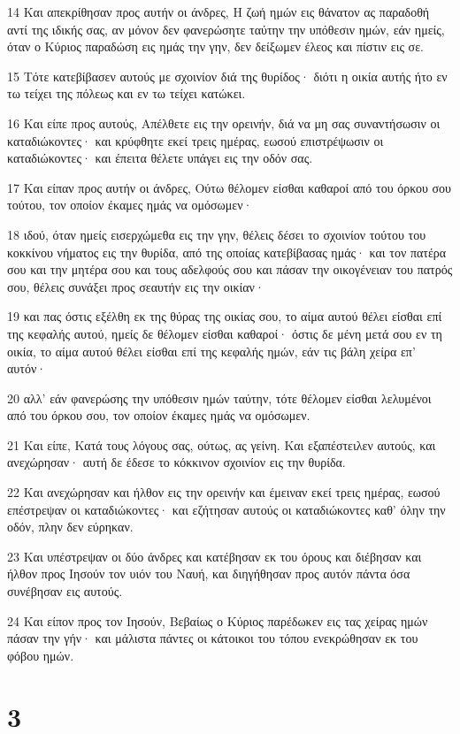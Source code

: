 \par 14 Και απεκρίθησαν προς αυτήν οι άνδρες, Η ζωή ημών εις θάνατον ας παραδοθή αντί της ιδικής σας, αν μόνον δεν φανερώσητε ταύτην την υπόθεσιν ημών, εάν ημείς, όταν ο Κύριος παραδώση εις ημάς την γην, δεν δείξωμεν έλεος και πίστιν εις σε.
\par 15 Τότε κατεβίβασεν αυτούς με σχοινίον διά της θυρίδος· διότι η οικία αυτής ήτο εν τω τείχει της πόλεως και εν τω τείχει κατώκει.
\par 16 Και είπε προς αυτούς, Απέλθετε εις την ορεινήν, διά να μη σας συναντήσωσιν οι καταδιώκοντες· και κρύφθητε εκεί τρεις ημέρας, εωσού επιστρέψωσιν οι καταδιώκοντες· και έπειτα θέλετε υπάγει εις την οδόν σας.
\par 17 Και είπαν προς αυτήν οι άνδρες, Ούτω θέλομεν είσθαι καθαροί από του όρκου σου τούτου, τον οποίον έκαμες ημάς να ομόσωμεν·
\par 18 ιδού, όταν ημείς εισερχώμεθα εις την γην, θέλεις δέσει το σχοινίον τούτου του κοκκίνου νήματος εις την θυρίδα, από της οποίας κατεβίβασας ημάς· και τον πατέρα σου και την μητέρα σου και τους αδελφούς σου και πάσαν την οικογένειαν του πατρός σου, θέλεις συνάξει προς σεαυτήν εις την οικίαν·
\par 19 και πας όστις εξέλθη εκ της θύρας της οικίας σου, το αίμα αυτού θέλει είσθαι επί της κεφαλής αυτού, ημείς δε θέλομεν είσθαι καθαροί· όστις δε μένη μετά σου εν τη οικία, το αίμα αυτού θέλει είσθαι επί της κεφαλής ημών, εάν τις βάλη χείρα επ' αυτόν·
\par 20 αλλ' εάν φανερώσης την υπόθεσιν ημών ταύτην, τότε θέλομεν είσθαι λελυμένοι από του όρκου σου, τον οποίον έκαμες ημάς να ομόσωμεν.
\par 21 Και είπε, Κατά τους λόγους σας, ούτως, ας γείνη. Και εξαπέστειλεν αυτούς, και ανεχώρησαν· αυτή δε έδεσε το κόκκινον σχοινίον εις την θυρίδα.
\par 22 Και ανεχώρησαν και ήλθον εις την ορεινήν και έμειναν εκεί τρεις ημέρας, εωσού επέστρεψαν οι καταδιώκοντες· και εζήτησαν αυτούς οι καταδιώκοντες καθ' όλην την οδόν, πλην δεν εύρηκαν.
\par 23 Και υπέστρεψαν οι δύο άνδρες και κατέβησαν εκ του όρους και διέβησαν και ήλθον προς Ιησούν τον υιόν του Ναυή, και διηγήθησαν προς αυτόν πάντα όσα συνέβησαν εις αυτούς.
\par 24 Και είπον προς τον Ιησούν, Βεβαίως ο Κύριος παρέδωκεν εις τας χείρας ημών πάσαν την γήν· και μάλιστα πάντες οι κάτοικοι του τόπου ενεκρώθησαν εκ του φόβου ημών.

\chapter{3}

